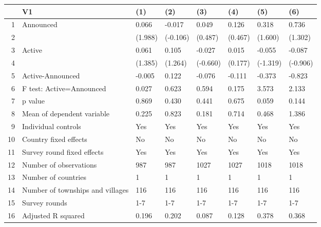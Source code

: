 \begin{table}[ht]
\centering
\begin{tabular}{rlllllll}
  \hline
 & V1 & (1) & (2) & (3) & (4) & (5) & (6) \\ 
  \hline
1 & Announced & 0.066 & -0.017 & 0.049 & 0.126 & 0.318 & 0.736 \\ 
  2 &  & (1.988) & (-0.106) & (0.487) & (0.467) & (1.600) & (1.302) \\ 
  3 & Active & 0.061 & 0.105 & -0.027 & 0.015 & -0.055 & -0.087 \\ 
  4 &  & (1.385) & (1.264) & (-0.660) & (0.177) & (-1.319) & (-0.906) \\ 
  5 & Active-Announced & -0.005 & 0.122 & -0.076 & -0.111 & -0.373 & -0.823 \\ 
  6 & F test: Active=Announced & 0.027 & 0.623 & 0.594 & 0.175 & 3.573 & 2.133 \\ 
  7 & p value & 0.869 & 0.430 & 0.441 & 0.675 & 0.059 & 0.144 \\ 
  8 & Mean of dependent variable & 0.225 & 0.823 & 0.181 & 0.714 & 0.468 & 1.386 \\ 
  9 & Individual controls & Yes & Yes & Yes & Yes & Yes & Yes \\ 
  10 & Country fixed effects & No & No & No & No & No & No \\ 
  11 & Survey round fixed effects & Yes & Yes & Yes & Yes & Yes & Yes \\ 
  12 & Number of observations & 987 & 987 & 1027 & 1027 & 1018 & 1018 \\ 
  13 & Number of countries & 1 & 1 & 1 & 1 & 1 & 1 \\ 
  14 & Number of townships and villages & 116 & 116 & 116 & 116 & 116 & 116 \\ 
  15 & Survey rounds & 1-7 & 1-7 & 1-7 & 1-7 & 1-7 & 1-7 \\ 
  16 & Adjusted R squared & 0.196 & 0.202 & 0.087 & 0.128 & 0.378 & 0.368 \\ 
   \hline
\end{tabular}
\end{table}
